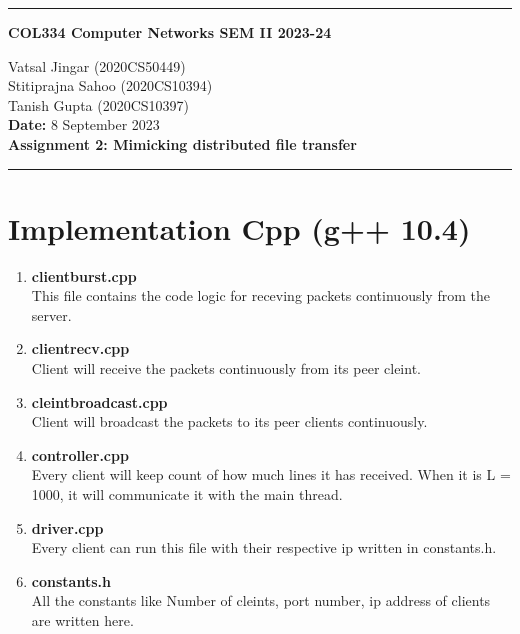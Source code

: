 \documentclass[12pt]{scrartcl}
\begin{document}
\onehalfspacing
\newcommand{\current}{June 2023}
\begin{center}
\hrule
\vspace{.4cm}
{\textbf { \large COL334 Computer Networks SEM II 2023-24}}
\end{center}
{
    \begin{center}
        Vatsal Jingar (2020CS50449)\\ Stitiprajna Sahoo (2020CS10394)\\ Tanish Gupta (2020CS10397)\\
        \textbf{Date:} 8 September 2023 \\
        \textbf{Assignment 2: Mimicking distributed file transfer}
    
    \end{center}
{ 
    \hrule
}
}
\section{Implementation Cpp (g++ 10.4)}
\begin{enumerate}
    \item \textbf{clientburst.cpp}\\
    This file contains the code logic for receving packets continuously from the server.
    \item \textbf{clientrecv.cpp}\\
    Client will receive the packets continuously from its peer cleint.
    \item \textbf{cleintbroadcast.cpp}\\
    Client will broadcast the packets to its peer clients continuously.
    \item \textbf{controller.cpp}\\
    Every client will keep count of how much lines it has received. When it is L = 1000, it will communicate it with the main thread.
    \item \textbf{driver.cpp}\\
    Every client can run this file with their respective ip written in constants.h.
    \item \textbf{constants.h}\\
    All the constants like Number of cleints, port number, ip address of clients are written here.
\end{enumerate}
\end{document}
